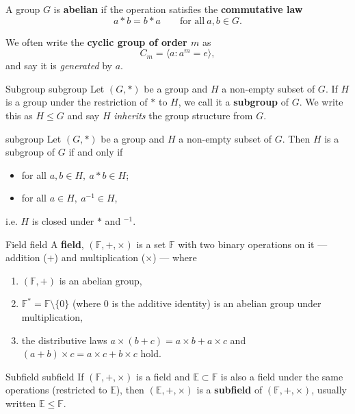 A group $G$ is \textbf{abelian} if the operation satisfies the \textbf{commutative law}
$$ a * b = b * a \qquad \text{for all} \ a, b \in G . $$

We often write the \textbf{cyclic group of order $m$} as
$$ C_m = \langle a : a^m = e \rangle , $$
and say it is \textit{generated} by $a$.

\begin{definition}{Subgroup \cite{math2601_notes}}{subgroup}
Let $(G, *)$ be a group and $H$ a non-empty subset of $G$. If $H$ is a group under the restriction of $*$ to $H$, we call it a \textbf{subgroup} of $G$. We write this as $H \leq G$ and say $H$ \textit{inherits} the group structure from $G$.
\end{definition}

\begin{lemma}{\cite{math2601_notes}}{subgroup}
Let $(G, *)$ be a group and $H$ a non-empty subset of $G$. Then $H$ is a subgroup of $G$ if and only if
\begin{itemize}
	\item for all $a, b \in H, \ a * b \in H$;
	\item for all $a \in H, \ a^{-1} \in H$,
\end{itemize}
i.e. $H$ is closed under $*$ and $^{-1}$.
\end{lemma}

\begin{definition}{Field \cite{math2601_notes}}{field}
A \textbf{field}, $(\mathbb{F}, +, \times)$ is a set $\mathbb{F}$ with two binary operations on it --- addition ($+$) and multiplication ($\times$) --- where
\begin{enumerate}
	\item $(\mathbb{F}, +)$ is an abelian group,
	\item $\mathbb{F}^{*} = \mathbb{F} \setminus \{0\}$ (where 0 is the additive identity) is an abelian group under multiplication,
	\item the distributive laws $a \times (b + c) = a \times b + a \times c$ and $(a + b) \times c = a \times c + b \times c$ hold.
\end{enumerate}
\end{definition}

\begin{definition}{Subfield \cite{math2601_notes}}{subfield}
If $(\mathbb{F}, +, \times)$ is a field and $\mathbb{E} \subset \mathbb{F}$ is also a field under the same operations (restricted to $\mathbb{E}$), then $(\mathbb{E}, +, \times)$ is a \textbf{subfield} of $(\mathbb{F}, +, \times)$, usually written $\mathbb{E} \leq \mathbb{F}$.
\end{definition}

